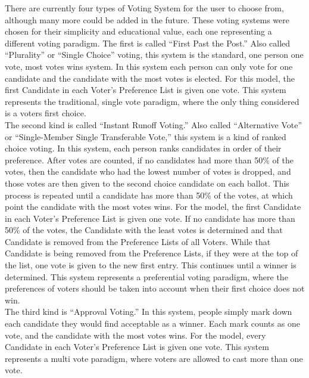\documentclass[12pt]{article}
\begin{document}
\qquad There are currently four types of Voting System for the user to choose from, although many more could be added in the future. These voting systems were chosen for their simplicity and educational value, each one representing a different voting paradigm. The first is called ``First Past the Post.'' Also called ``Plurality'' or ``Single Choice'' voting, this system is the standard, one person one vote, most votes wins system. In this system each person can only vote for one candidate and the candidate with the most votes is elected. For this model, the first Candidate in each Voter's Preference List is given one vote. This system represents the traditional, single vote paradigm, where the only thing considered is a voters first choice. \\

\qquad The second kind is called ``Instant Runoff Voting.'' Also called ``Alternative Vote'' or ``Single-Member Single Transferable Vote,'' this system is a kind of ranked choice voting. In this system, each person ranks candidates in order of their preference. After votes are counted, if no candidates had more than 50\% of the votes, then the candidate who had the lowest number of votes is dropped, and those votes are then given to the second choice candidate on each ballot. This process is repeated until a candidate has more than 50\% of the votes, at which point the candidate with the most votes wins. For the model, the first Candidate in each Voter's Preference List is given one vote. If no candidate has more than 50\% of the votes, the Candidate with the least votes is determined and that Candidate is removed from the Preference Lists of all Voters. While that Candidate is being removed from the Preference Lists, if they were at the top of the list, one vote is given to the new first entry. This continues until a winner is determined. This system represents a preferential voting paradigm, where the preferences of voters should be taken into account when their first choice does not win. \\

\qquad The third kind is ``Approval Voting.'' In this system, people simply mark down each candidate they would find acceptable as a winner. Each mark counts as one vote, and the candidate with the most votes wins. For the model, every Candidate in each Voter's Preference List is given one vote. This system represents a multi vote paradigm, where voters are allowed to cast more than one vote. \\
\end{document}
